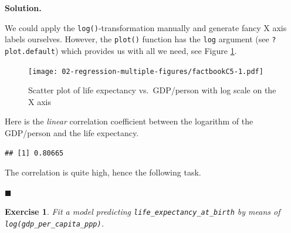 \documentclass[10pt,b5paper,krantz1]{krantz}
\newenvironment{Shaded}{\begin{snugshade}}{\end{snugshade}}
\newcommand{\DataTypeTok}[1]{\textcolor[rgb]{0.27,0.27,0.27}{#1}}
\newcommand{\KeywordTok}[1]{\textcolor[rgb]{0.27,0.27,0.27}{\textbf{#1}}}
\newcommand{\NormalTok}[1]{#1}
\newcommand{\OperatorTok}[1]{\textcolor[rgb]{0.43,0.43,0.43}{\textbf{#1}}}
\newcommand{\StringTok}[1]{\textcolor[rgb]{0.5,0.5,0.5}{#1}}
\newtheorem{exercise}{Exercise}[chapter]
\newenvironment{solution}{%
\bigskip\noindent\textbf{Solution. }%
\it\ignorespaces%
\ignorespaces%
}{\ignorespaces%
\hfill$\blacksquare$%
}
\begin{document}
\begin{solution}

We could apply the \texttt{log()}-transformation manually
and generate fancy X axis labels ourselves. However,
the \texttt{plot()} function has the \texttt{log} argument (see \texttt{?plot.default})
which provides us with all we need, see Figure \ref{fig:factbookC5}.

\begin{Shaded}
\end{Shaded}

\begin{figure}
\hypertarget{fig:factbookC5}{%
\centering
\texttt{[image: 02-regression-multiple-figures/factbookC5-1.pdf]}
\caption{Scatter plot of life expectancy vs.~GDP/person with log scale on the X axis}\label{fig:factbookC5}
}
\end{figure}

Here is the \emph{linear} correlation coefficient between the logarithm
of the GDP/person and the life expectancy.

\begin{Shaded}
\end{Shaded}

\begin{verbatim}
## [1] 0.80665
\end{verbatim}

The correlation is quite high, hence the following task.

\end{solution}

\begin{exercise}

Fit a model predicting \texttt{life\_expectancy\_at\_birth}
by means of \texttt{log(gdp\_per\_capita\_ppp)}.

\end{exercise}
\end{document}
